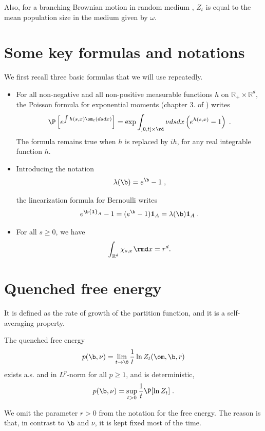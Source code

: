 Also, for a  branching Brownian motion in random medium \cite{Shiozawa-clt, Shiozawa-loc}, $Z_t$ is equal to the mean population size in the medium given by $\omega$.

\section{Some key formulas and notations}
We first recall three basic formulas that we will use repeatedly.
\begin{itemize}
\item 
For all non-negative and all non-positive measurable functions $h$ on $\mathbb{R}_+\times \mathbb{R}^d$, the Poisson formula for exponential moments (chapter 3. of \cite{LastPenrose}) writes
\begin{equation} \label{eq:PoissonExpMoment}
\P\left[ e^{\int h(s,x) \om_t(ds dx)}\right] = \exp \int_{]0,t]\times \rd} \nu ds dx \left( e^{h(s,x)}-1 \right)   \;.
\end{equation}
The formula remains true when $h$ is replaced by $i h$, for any real integrable function $h$. %
\item Introducing the notation 
\begin{equation}
\lambda(\b)= e^\b-1\;,
\end{equation}

the linearization formula for Bernoulli writes
\begin{equation}\label{eq:linBer}
e^{\b {\bf 1}_A}-1 = (e^\b-1) {\bf 1}_A =  \lambda(\b) {\bf 1}_A\;.
\end{equation}
\item For all $s\geq 0$, we have 
\begin{equation}\int_{\mathbb{R}^d} \chi_{s,x} \hspace{0.3mm} \rmd x = r^d.
\end{equation}
\end{itemize}

\section{Quenched free energy}
It is defined as the rate of growth of the partition function, and it is a self-averaging property.

\begin{theorem} \label{th:freeenergy}
The quenched free energy
$$ p(\b, \nu) =  \lim_{t \to \8} \frac{1}{t} \ln Z_t (\om, \b, r)
$$
exists a.s. and in $L^p$-norm for all $p \geq 1$, and is deterministic,
$$
 p(\b, \nu) = \sup_{t >0}  \frac{1}{t}\P[\ln Z_t]\;.
$$
\end{theorem}
\begin{remark} We omit the parameter $r>0$  from the notation for the free energy.
The reason is that,  in contrast to $\b$ and $ \nu$, it is kept fixed most of the time.
\end{remark}

